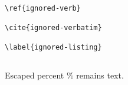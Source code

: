 % 
\cite{kept}
\verb|\ref{ignored-verb}|
\begin{verbatim}
\cite{ignored-verbatim}
\end{verbatim}
\begin{lstlisting}
\label{ignored-listing}
\end{lstlisting}
\begin{verbatim}

\end{verbatim}
Escaped percent \% remains text.
